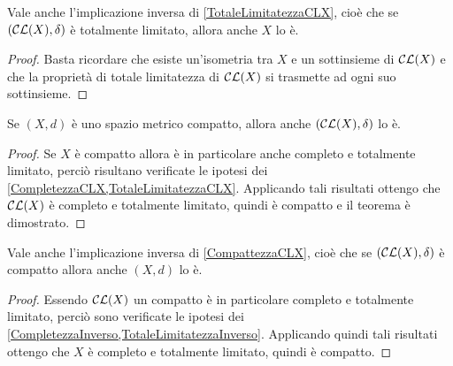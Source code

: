 \begin{remark}\label{TotaleLimitatezzaInverso}
	Vale anche l'implicazione inversa di \cref{TotaleLimitatezzaCLX}, cioè che se  $(\mathcal{CL}(X),\delta)$ è totalmente limitato, allora anche $X$ lo è.
\end{remark}
\begin{proof}
	Basta ricordare che esiste un'isometria tra $X$ e un sottinsieme di $\mathcal{CL}(X)$ e che la proprietà di totale limitatezza di $\mathcal{CL}(X)$ si trasmette ad ogni suo sottinsieme.
\end{proof}



\begin{theorem} \label{CompattezzaCLX}
	Se $(X,d)$ è uno spazio metrico compatto, allora anche $(\mathcal{CL}(X),\delta)$ lo è.
\end{theorem}
\begin{proof}
	Se $X$ è compatto allora è in particolare anche completo e totalmente limitato, perciò risultano verificate le ipotesi dei \cref{CompletezzaCLX,TotaleLimitatezzaCLX}. Applicando tali risultati ottengo che $\mathcal{CL}(X)$ è completo e totalmente limitato, quindi è compatto e il teorema è dimostrato.
\end{proof}

\begin{remark} \label{CompattezzaInverso}
	Vale anche l'implicazione inversa di \cref{CompattezzaCLX}, cioè che se  $(\mathcal{CL}(X),\delta)$ è compatto allora anche $(X,d)$ lo è.
\end{remark}
\begin{proof}
	Essendo $\mathcal{CL}(X)$ un compatto è in particolare completo e totalmente limitato, perciò sono verificate le ipotesi dei \cref{CompletezzaInverso,TotaleLimitatezzaInverso}. Applicando quindi tali risultati ottengo che $X$ è completo e totalmente limitato, quindi è compatto.
\end{proof}

